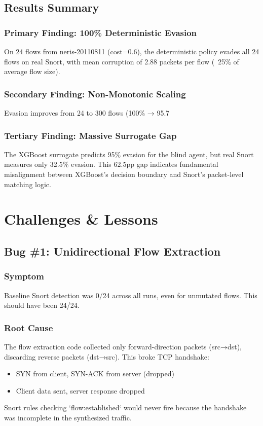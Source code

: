 \documentclass[12pt,a4paper]{report}
\begin{document}
\section{Results Summary}

\subsection{Primary Finding: 100\% Deterministic Evasion}

On 24 flows from neris-20110811 (cost=0.6), the deterministic policy evades all 24 flows on real Snort, with mean corruption of 2.88 packets per flow (~25\% of average flow size).

\subsection{Secondary Finding: Non-Monotonic Scaling}

Evasion improves from 24 to 300 flows (100\% → 95.7%

\subsection{Tertiary Finding: Massive Surrogate Gap}

The XGBoost surrogate predicts 95\% evasion for the blind agent, but real Snort measures only 32.5\% evasion. This 62.5pp gap indicates fundamental misalignment between XGBoost's decision boundary and Snort's packet-level matching logic.

\chapter{Challenges \& Lessons}

\section{Bug \#1: Unidirectional Flow Extraction}

\subsection{Symptom}
Baseline Snort detection was 0/24 across all runs, even for unmutated flows. This should have been 24/24.

\subsection{Root Cause}
The flow extraction code collected only forward-direction packets (src→dst), discarding reverse packets (dst→src). This broke TCP handshake:
\begin{itemize}
  \item SYN from client, SYN-ACK from server (dropped)
  \item Client data sent, server response dropped
\end{itemize}
Snort rules checking `flow:established` would never fire because the handshake was incomplete in the synthesized traffic.
\end{document}
